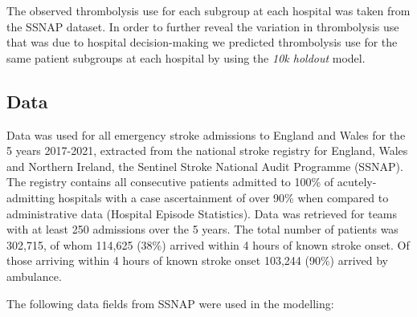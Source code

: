 The observed thrombolysis use for each subgroup at each hospital was taken from the SSNAP dataset. In order to further reveal the variation in thrombolysis use that was due to hospital decision-making we predicted thrombolysis use for the same patient subgroups at each hospital by using the \emph{10k holdout} model.


\subsection{Data}

Data was used for all emergency stroke admissions to England and Wales for the 5 years 2017-2021, extracted from the national stroke registry for England, Wales and Northern Ireland, the Sentinel Stroke National Audit Programme (SSNAP). The registry contains all consecutive patients admitted to 100\% of acutely-admitting hospitals with a case ascertainment of over 90\% when compared to administrative data (Hospital Episode Statistics). Data was retrieved for teams with at least 250 admissions over the 5 years. The total number of patients was 302,715, of whom 114,625 (38\%) arrived within 4 hours of known stroke onset. Of those arriving within 4 hours of known stroke onset 103,244 (90\%) arrived by ambulance.

The following data fields from SSNAP were used in the modelling:

